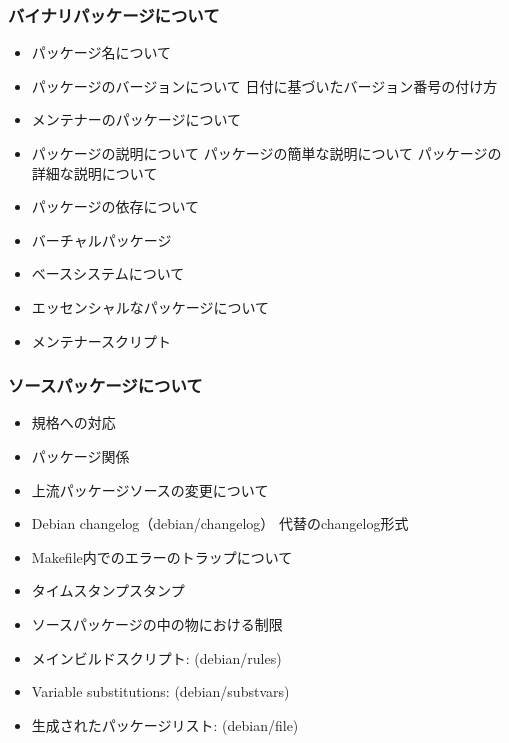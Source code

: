 \documentclass[mingoth,a4paper]{jsarticle}
\begin{document}
    \subsubsection{バイナリパッケージについて}

\begin{itemize}
        \item パッケージ名について
        \item パッケージのバージョンについて
            日付に基づいたバージョン番号の付け方

        \item メンテナーのパッケージについて
        \item パッケージの説明について
            パッケージの簡単な説明について
            パッケージの詳細な説明について

        \item パッケージの依存について
        \item バーチャルパッケージ
        \item ベースシステムについて
        \item エッセンシャルなパッケージについて
        \item メンテナースクリプト
\end{itemize}

    \subsubsection{ソースパッケージについて}
\begin{itemize}
        \item 規格への対応
        \item パッケージ関係
        \item 上流パッケージソースの変更について
        \item Debian changelog（debian/changelog）
            代替のchangelog形式
        \item Makefile内でのエラーのトラップについて
        \item タイムスタンプスタンプ
        \item ソースパッケージの中の物における制限
        \item メインビルドスクリプト: (debian/rules)
        \item Variable substitutions: (debian/substvars)
        \item 生成されたパッケージリスト: (debian/file)
\end{itemize}
\end{document}
